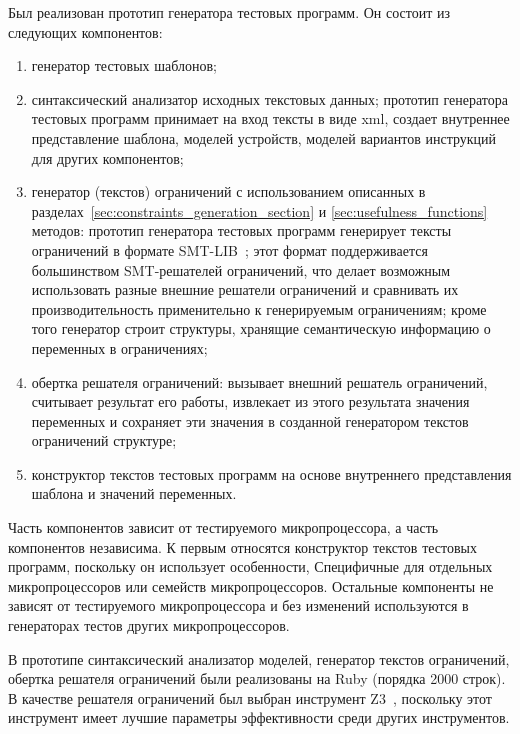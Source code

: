 Был реализован прототип генератора тестовых программ. Он состоит из следующих компонентов: %
\begin{enumerate}
  \item генератор тестовых шаблонов;
  \item синтаксический анализатор исходных текстовых данных; прототип генератора тестовых программ принимает на вход тексты в виде xml, создает внутреннее представление шаблона, моделей устройств, моделей вариантов инструкций для других компонентов;
  \item генератор (текстов) ограничений с использованием описанных в разделах~\ref{sec:constraints_generation_section} и \ref{sec:usefulness_functions} методов: прототип генератора тестовых программ генерирует тексты ограничений в формате SMT-LIB~\cite{SMT}; этот формат поддерживается большинством SMT-решателей ограничений, что делает возможным использовать разные внешние решатели ограничений и сравнивать их производительность применительно к генерируемым ограничениям; кроме того генератор строит структуры, хранящие семантическую информацию о переменных в ограничениях;
  \item обертка решателя ограничений: вызывает внешний решатель ограничений, считывает результат его работы, извлекает из этого результата значения переменных и сохраняет эти значения в созданной генератором текстов ограничений структуре;
  \item конструктор текстов тестовых программ на основе внутреннего представления шаблона и значений переменных.
\end{enumerate}

Часть компонентов зависит от тестируемого микропроцессора, а часть компонентов независима. К первым относятся конструктор текстов тестовых программ, поскольку он использует особенности, Специфичные для отдельных микропроцессоров или семейств микропроцессоров. Остальные компоненты не зависят от тестируемого микропроцессора и без изменений используются в генераторах тестов других микропроцессоров.

В прототипе синтаксический анализатор моделей, генератор текстов ограничений, обертка решателя ограничений были реализованы на Ruby (порядка 2000 строк). В качестве решателя ограничений был выбран инструмент Z3~\cite{Z3}, поскольку этот инструмент имеет лучшие параметры эффективности среди других инструментов.

